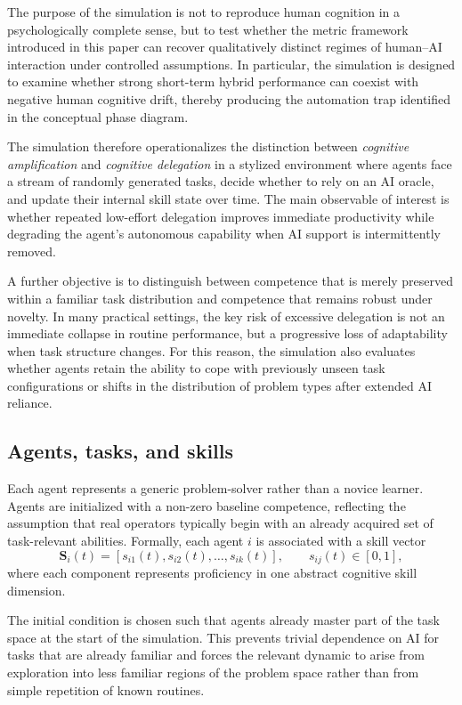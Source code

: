 \documentclass[11pt,a4paper]{article}
\begin{document}
The purpose of the simulation is not to reproduce human cognition in a psychologically complete sense, but to test whether the metric framework introduced in this paper can recover qualitatively distinct regimes of human--AI interaction under controlled assumptions. In particular, the simulation is designed to examine whether strong short-term hybrid performance can coexist with negative human cognitive drift, thereby producing the automation trap identified in the conceptual phase diagram.

The simulation therefore operationalizes the distinction between \emph{cognitive amplification} and \emph{cognitive delegation} in a stylized environment where agents face a stream of randomly generated tasks, decide whether to rely on an AI oracle, and update their internal skill state over time. The main observable of interest is whether repeated low-effort delegation improves immediate productivity while degrading the agent's autonomous capability when AI support is intermittently removed.

A further objective is to distinguish between competence that is merely preserved within a familiar task distribution and competence that remains robust under novelty. In many practical settings, the key risk of excessive delegation is not an immediate collapse in routine performance, but a progressive loss of adaptability when task structure changes. For this reason, the simulation also evaluates whether agents retain the ability to cope with previously unseen task configurations or shifts in the distribution of problem types after extended AI reliance.

\subsection{Agents, tasks, and skills}

Each agent represents a generic problem-solver rather than a novice learner. Agents are initialized with a non-zero baseline competence, reflecting the assumption that real operators typically begin with an already acquired set of task-relevant abilities. Formally, each agent $i$ is associated with a skill vector
\[
\mathbf{S}_i(t) = \left[s_{i1}(t), s_{i2}(t), \dots, s_{ik}(t)\right], \qquad s_{ij}(t) \in [0,1],
\]
where each component represents proficiency in one abstract cognitive skill dimension.

The initial condition is chosen such that agents already master part of the task space at the start of the simulation. This prevents trivial dependence on AI for tasks that are already familiar and forces the relevant dynamic to arise from exploration into less familiar regions of the problem space rather than from simple repetition of known routines.
\end{document}
